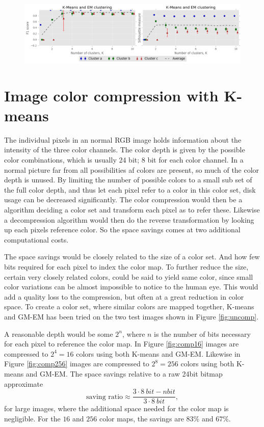 \documentclass[a4paper,10pt,article,oneside,english]{memoir}
\let\oldcaption\caption
\renewcommand{\caption}[1]{\oldcaption{\emph{#1}}}
\begin{document}
\begin{figure}
	\centering
	\includegraphics[width=\textwidth]{combined_clustering.png}
	\caption{}
	\label{fig:combined_clustering}
\end{figure}

\section*{Image color compression with K-means}
The individual pixels in an normal RGB image holds information about the intensity of the three color channels. The color depth is given by the possible color combinations, which is usually 24 bit; 8 bit for each color channel. In a normal picture far from all possibilities af colors are present, so much of the color depth is unused. By limiting the number of possible colors to a small sub set of the full color depth, and thus let each pixel refer to a color in this color set, disk usage can be decreased significantly. The color compression would then be a algorithm deciding a color set and transform each pixel as to refer these. Likewise a decompression algorithm would then do the reverse transformation by looking up each pixels reference color. So the space savings comes at two additional computational costs.

The space savings would be closely related to the size of a color set. And how few bits required for each pixel to index the color map. To further reduce the size, certain very closely related colors, could be said to yield same color, since small color variations can be almost impossible to notice to the human eye. This would add a quality loss to the compression, but often at a great reduction in color space. To create a color set, where similar colors are mapped together, K-means and GM-EM has been tried on the two test images shown in Figure \ref{fig:uncomp}. 

A reasonable depth would be some $2^n$, where $n$ is the number of bits necessary for each pixel to reference the color map. In Figure \ref{fig:comp16} images are compressed to $2^4=16$ colors using both K-means and GM-EM. Likewise in Figure \ref{fig:comp256} images are compressed to $2^8=256$ colors using both K-means and GM-EM. The space savings relative to a raw 24bit bitmap approximate 
$$\text{saving ratio} \approx \frac{3 \cdot \SI{8}{bit}- n \si{bit}}{3 \cdot\SI{8}{bit}},$$
for large images, where the additional space needed for the color map is negligible. For the $16$ and $256$ color maps, the savings are $83\%$ and $67\%$. 
\end{document}
